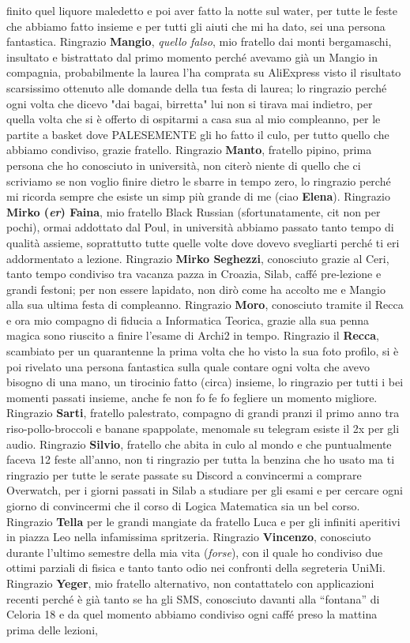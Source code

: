 finito quel liquore maledetto e poi aver fatto la notte sul water, per tutte le feste che abbiamo fatto insieme e per tutti gli aiuti che mi ha dato, sei una persona fantastica. Ringrazio \textbf{Mangio}, \textit{quello falso}, mio fratello dai monti bergamaschi, insultato e bistrattato dal primo momento perché avevamo già un Mangio in compagnia, probabilmente la laurea l'ha comprata su AliExpress visto il risultato scarsissimo ottenuto alle domande della tua festa di laurea; lo ringrazio perché ogni volta che dicevo "dai bagai, birretta" lui non si tirava mai indietro, per quella volta che si è offerto di ospitarmi a casa sua al mio compleanno, per le partite a basket dove PALESEMENTE gli ho fatto il culo, per tutto quello che abbiamo condiviso, grazie fratello. Ringrazio \textbf{Manto}, fratello pipino, prima persona che ho conosciuto in università, non citerò niente di quello che ci scriviamo se non voglio finire dietro le sbarre in tempo zero, lo ringrazio perché mi ricorda sempre che esiste un simp più grande di me (ciao \textbf{Elena}). Ringrazio \textbf{Mirko (\textit{er}) Faina}, mio fratello Black Russian (sfortunatamente, cit non per pochi), ormai addottato dal Poul, in università abbiamo passato tanto tempo di qualità assieme, soprattutto tutte quelle volte dove dovevo svegliarti perché ti eri addormentato a lezione. Ringrazio \textbf{Mirko Seghezzi}, conosciuto grazie al Ceri, tanto tempo condiviso tra vacanza pazza in Croazia, Silab, caffé pre-lezione e grandi festoni; per non essere lapidato, non dirò come ha accolto me e Mangio alla sua ultima festa di compleanno. Ringrazio \textbf{Moro}, conosciuto tramite il Recca e ora mio compagno di fiducia a Informatica Teorica, grazie alla sua penna magica sono riuscito a finire l'esame di Archi2 in tempo. Ringrazio il \textbf{Recca}, scambiato per un quarantenne la prima volta che ho visto la sua foto profilo, si è poi rivelato una persona fantastica sulla quale contare ogni volta che avevo bisogno di una mano, un tirocinio fatto (circa) insieme, lo ringrazio per tutti i bei momenti passati insieme, anche fe non fo fe fo fegliere un momento migliore. Ringrazio \textbf{Sarti}, fratello palestrato, compagno di grandi pranzi il primo anno tra riso-pollo-broccoli e banane spappolate, menomale su telegram esiste il 2x per gli audio. Ringrazio \textbf{Silvio}, fratello che abita in culo al mondo e che puntualmente faceva 12 feste all'anno, non ti ringrazio per tutta la benzina che ho usato ma ti ringrazio per tutte le serate passate su Discord a convincermi a comprare Overwatch, per i giorni passati in Silab a studiare per gli esami e per cercare ogni giorno di convincermi che il corso di Logica Matematica sia un bel corso. Ringrazio \textbf{Tella} per le grandi mangiate da fratello Luca e per gli infiniti aperitivi in piazza Leo nella infamissima spritzeria. Ringrazio \textbf{Vincenzo}, conosciuto durante l'ultimo semestre della mia vita (\textit{forse}), con il quale ho condiviso due ottimi parziali di fisica e tanto tanto odio nei confronti della segreteria UniMi. Ringrazio \textbf{Yeger}, mio fratello alternativo, non contattatelo con applicazioni recenti perché è già tanto se ha gli SMS, conosciuto davanti alla ``fontana'' di Celoria 18 e da quel momento abbiamo condiviso ogni caffé preso la mattina prima delle lezioni, 